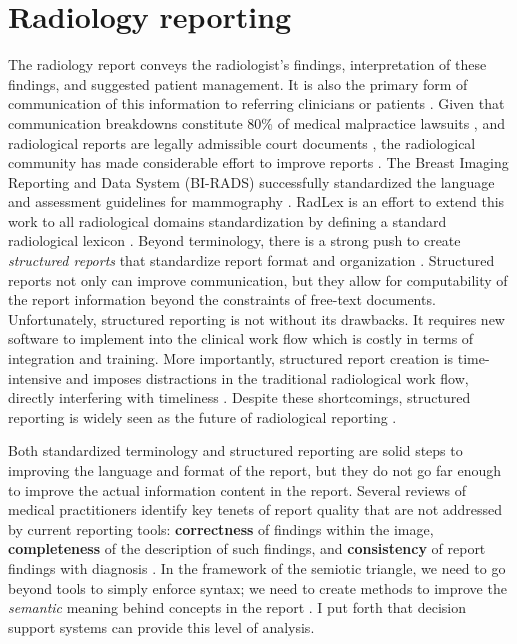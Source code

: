 \section{Radiology reporting}
The radiology report conveys the radiologist's findings, interpretation of these findings, and suggested patient management. It is also the primary form of communication of this information to referring clinicians or patients \cite{Sistrom:2005cx}. Given that communication breakdowns constitute 80\% of medical malpractice lawsuits \cite{Levinson:1994ko}, and radiological reports are legally admissible court documents \cite{Oppenheim:2012tq}, the radiological community has made considerable effort to improve reports \cite{Langlotz:2015vq}. The Breast Imaging Reporting and Data System (BI-RADS) successfully standardized the language and assessment guidelines for mammography \cite{Liberman:ws,Langlotz:2009fn,Burnside:2009ki}. RadLex is an effort to extend this work to all radiological domains standardization by defining a standard radiological lexicon \cite{Langlotz:2006jn}. Beyond terminology, there is a strong push to create \emph{structured reports} that standardize report format and organization \cite{Langlotz:2009dd,Reiner:2009ib}. Structured reports not only can improve communication, but they allow for computability of the report information beyond the constraints of free-text documents. Unfortunately, structured reporting is not without its drawbacks. It requires new software to implement into the clinical work flow which is costly in terms of integration and training. More importantly, structured report creation is time-intensive and imposes distractions in the traditional radiological work flow, directly interfering with timeliness \cite{Weiss:2008er}. Despite these shortcomings, structured reporting is widely seen as the future of radiological reporting \cite{Langlotz:2015vq}.

Both standardized terminology and structured reporting are solid steps to improving the language and format of the report, but they do not go far enough to improve the actual information content in the report. Several reviews of medical practitioners identify key tenets of report quality that are not addressed by current reporting tools: \textbf{correctness} of findings within the image, \textbf{completeness} of the description of such findings, and \textbf{consistency} of report findings with diagnosis \cite{Johnson:2004kh, HaraldO:2004hi, Reiner:2006fa}. In the framework of the semiotic triangle, we need to go beyond tools to simply enforce syntax; we need to create methods to improve the \emph{semantic} meaning behind concepts in the report \cite{Mead:2006wm}. I put forth that decision support systems can provide this level of analysis. 


